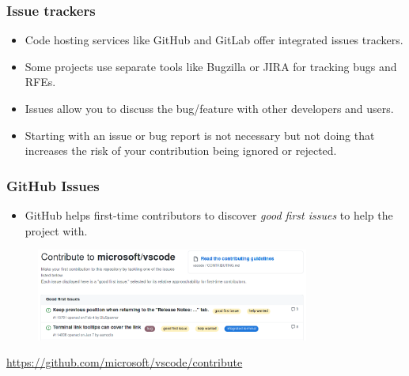 \documentclass[aspectratio=169]{beamer}              %
\begin{document}
\begin{frame}
	\frametitle{Issue trackers}
	
	\begin{block}{}
		\begin{itemize}
			\item Code hosting services like GitHub and GitLab offer integrated issues trackers.
			\item Some projects use separate tools like Bugzilla or JIRA for tracking bugs and RFEs.
		\end{itemize}
	\end{block}

	\begin{block}{}
		\begin{itemize}
			\item Issues allow you to discuss the bug/feature with other developers and users.
			\item Starting with an issue or bug report is not necessary but not doing that increases the risk of your contribution being ignored or rejected.
		\end{itemize}
	\end{block}
\end{frame}

\begin{frame}
	\frametitle{GitHub Issues}
	
	\begin{block}{}
		\begin{itemize}
			\item GitHub helps first-time contributors to discover \emph{good first issues} to help the project with.
		\end{itemize}
	\end{block}
	
	\begin{figure}[ht!]
	\begin{center}
  	  \includegraphics[width=0.8\textwidth]{img/gh-good-first-issue.png}
	\end{center}
	\end{figure}


\tiny{\url{https://github.com/microsoft/vscode/contribute}}
\end{frame}
\end{document}
